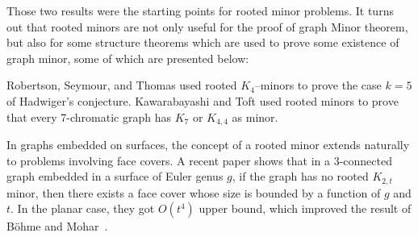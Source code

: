Those two results were the starting points for rooted minor problems. 
\newline
It turns out that rooted minors are not only
useful for the proof of graph Minor theorem, but also for some structure theorems which are used to prove some existence
of graph minor, some of which are presented below:

Robertson, Seymour, and Thomas \cite{robertson_seymour_1993} used rooted $K_4$–minors to prove the case $k=5$ of Hadwiger's conjecture.
Kawarabayashi and Toft \cite{Kawarabayashi2005} used rooted minors to prove that every 7-chromatic graph has $K_7$ or $K_{4,4}$ as minor.

In graphs embedded on surfaces, the concept of a rooted minor extends naturally to problems involving
face covers. A recent paper \cite{Fiorini2025} shows that in a 3-connected
graph embedded in a surface of Euler genus $g$, if the graph has no rooted $K_{2,t}$ minor,
then there exists a face cover whose size is bounded by a function of $g$ and $t$. 
In the planar case, they got $O(t^4)$ upper bound, which improved the result of Böhme and Mohar~\cite{BOHME2002291}.